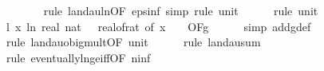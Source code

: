 \begin{isabellebody}
\ \ \ \ \ \ \isamarkupfalse%
\ {\isacharparenleft}{\kern0pt}rule\ landau{\isacharunderscore}{\kern0pt}ln{\isacharunderscore}{\kern0pt}{}{\isacharbrackleft}{\kern0pt}OF\ eps{\isacharunderscore}{\kern0pt}inf{\isacharbrackright}{\kern0pt}{\isacharcomma}{\kern0pt}\ simp{\isacharcomma}{\kern0pt}\ rule\ unit{\isacharunderscore}{\kern0pt}{}{\isacharparenright}{\kern0pt}\isanewline
\ \ \ \ \isamarkupfalse%
\ {\isacharparenleft}{\kern0pt}rule\ unit{\isacharunderscore}{\kern0pt}{}{\isacharparenright}{\kern0pt}\isanewline
\isanewline
\ \ \isamarkupfalse%
\ l{}{\isacharcolon}{\kern0pt}\ {\isachardoublequoteopen}{\isacharparenleft}{\kern0pt}{\isasymlambda}x{\isachardot}{\kern0pt}\ ln\ {\isacharparenleft}{\kern0pt}real\ {\isacharparenleft}{\kern0pt}nat\ {\isasymlceil}{}{}\ {\isacharslash}{\kern0pt}\ {\isacharparenleft}{\kern0pt}real{\isacharunderscore}{\kern0pt}of{\isacharunderscore}{\kern0pt}rat\ {\isacharparenleft}{\kern0pt}{\isasymdelta}{\isacharunderscore}{\kern0pt}of\ x{\isacharparenright}{\kern0pt}{\isacharparenright}{\kern0pt}\ {\isacharplus}{\kern0pt}\ {}{\isacharparenright}{\kern0pt}{\isacharparenright}{\kern0pt}\ {\isasymin}\ O{\isacharbrackleft}{\kern0pt}{\isacharquery}{\kern0pt}F{\isacharbrackright}{\kern0pt}{\isacharparenleft}{\kern0pt}g{\isacharparenright}{\kern0pt}{\isachardoublequoteclose}\isanewline
\ \ \ \ \isamarkupfalse%
\ {\isacharparenleft}{\kern0pt}simp\ add{\isacharcolon}{\kern0pt}g{\isacharunderscore}{\kern0pt}def{\isacharparenright}{\kern0pt}\isanewline
\ \ \ \ \isamarkupfalse%
\ {\isacharparenleft}{\kern0pt}rule\ landau{\isacharunderscore}{\kern0pt}o{\isachardot}{\kern0pt}big{\isacharunderscore}{\kern0pt}mult{\isacharunderscore}{\kern0pt}{}{\isacharprime}{\kern0pt}{\isacharbrackleft}{\kern0pt}OF\ unit{\isacharunderscore}{\kern0pt}{}{\isacharbrackright}{\kern0pt}{\isacharparenright}{\kern0pt}\isanewline
\ \ \ \ \isamarkupfalse%
\ {\isacharparenleft}{\kern0pt}rule\ landau{\isacharunderscore}{\kern0pt}sum{\isacharunderscore}{\kern0pt}{}{\isacharparenright}{\kern0pt}\isanewline
\ \ \ \ \ \ \isamarkupfalse%
\ {\isacharparenleft}{\kern0pt}rule\ eventually{\isacharunderscore}{\kern0pt}ln{\isacharunderscore}{\kern0pt}ge{\isacharunderscore}{\kern0pt}iff{\isacharbrackleft}{\kern0pt}OF\ n{\isacharunderscore}{\kern0pt}inf{\isacharbrackright}{\kern0pt}{\isacharparenright}{\kern0pt}\isanewline

\end{isabellebody}
